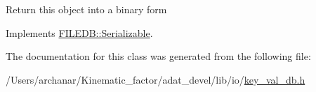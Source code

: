 Return this object into a binary form 

Implements \mbox{\hyperlink{classFILEDB_1_1Serializable_a8deaa86e108c08c863881e46cf5578ea}{F\+I\+L\+E\+D\+B\+::\+Serializable}}.



The documentation for this class was generated from the following file\+:\begin{DoxyCompactItemize}
\item 
/\+Users/archanar/\+Kinematic\+\_\+factor/adat\+\_\+devel/lib/io/\mbox{\hyperlink{lib_2io_2key__val__db_8h}{key\+\_\+val\+\_\+db.\+h}}\end{DoxyCompactItemize}
